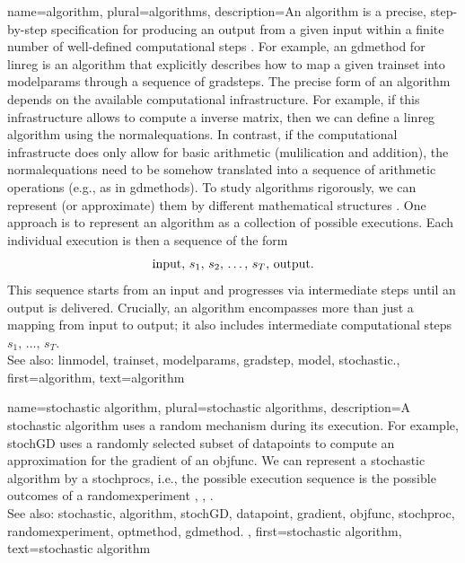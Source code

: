 {name={algorithm}, plural={algorithms},
 	description={An algorithm is a precise, step-by-step specification for 
  		producing an output from a given input within a finite number of well-defined 
		computational steps \cite{Cormen:2022aa}. For example, an \gls{gdmethod} for \gls{linreg} 
		is an algorithm that explicitly describes how to map a given \gls{trainset} 
		into \glspl{modelparam} through a sequence of \glspl{gradstep}. The precise form of 
		an algorithm depends on the available computational infrastructure. For example, if 
		this infrastructure allows to compute a \gls{inverse} \gls{matrix}, then we can 
		define a \gls{linreg} algorithm using the \gls{normalequations}. In contrast, if 
		the computational infrastructe does only allow for basic arithmetic (mulilication and addition), 
		the \gls{normalequations} need to be somehow translated into a sequence of arithmetic 
		operations (e.g., as in \glspl{gdmethod}). 
		To study algorithms rigorously, we can represent (or approximate) them by different 
			mathematical structures \cite{Sipser2013}. One approach is to represent an algorithm 
			as a collection of possible executions. Each individual execution is then a 
			sequence of the form $${\rm input}, \,s_1, \,s_2, \,\ldots, \,s_T, \,{\rm output}.$$ 
			This sequence starts from an input and progresses via intermediate steps until an 
			output is delivered. Crucially, an algorithm encompasses more than just a mapping 
			from input to output; it also includes intermediate computational 
     		steps $s_1, \,\ldots, \,s_T$.
				\\ 
		See also: \gls{linmodel}, \gls{trainset}, \glspl{modelparam}, \gls{gradstep}, \gls{model}, \gls{stochastic}.},
	first={algorithm},
	text={algorithm} 
}

{name={stochastic algorithm}, 
 plural={stochastic algorithms},
	description={A \gls{stochastic} \gls{algorithm} uses a random mechanism 
		during its execution. For example, \gls{stochGD} uses a randomly selected subset of \glspl{datapoint} 
		to compute an approximation for the \gls{gradient} of an \gls{objfunc}. We can represent a 
		\gls{stochastic} \gls{algorithm} by a \glspl{stochproc}, i.e., the possible execution sequence is the possible outcomes of 
		a \gls{randomexperiment} \cite{BertsekasProb}, \cite{RandomizedAlgos}, \cite{Gallager13}.		
		\\ 
		See also: \gls{stochastic}, \gls{algorithm}, \gls{stochGD}, \gls{datapoint}, \gls{gradient}, \gls{objfunc}, \gls{stochproc}, 
		\gls{randomexperiment}, \gls{optmethod}, \gls{gdmethod}. },
	first={stochastic algorithm},
	text={stochastic algorithm} 
}

